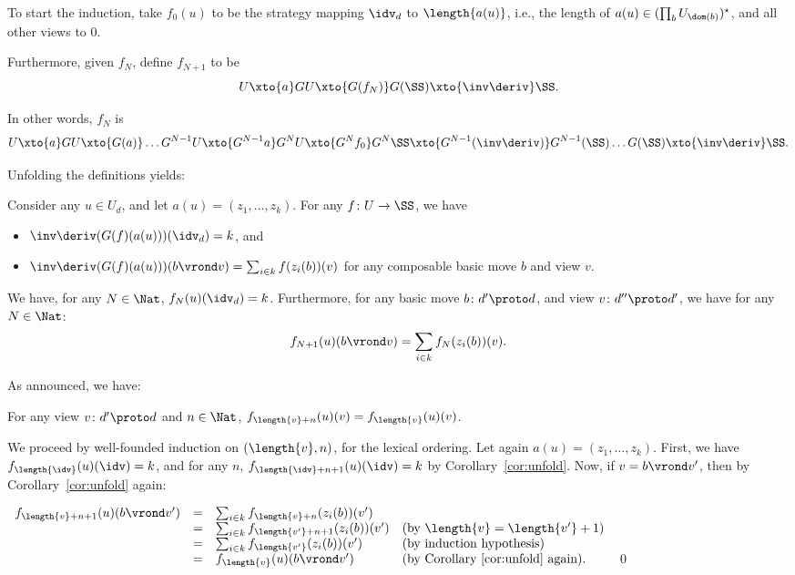 \documentclass{LMCS}
\theoremstyle{plain}\newtheorem{satz}[thm]{Satz}
\begin{document}
To start the induction, take $f_0 (u)$ to be the strategy mapping
$\idv_{d}$ to $\length{a (u)}$, i.e., the length of $a (u) \in
(\prod_{b} U_{\dom (b)})^\star$, and all other views to $0$.

Furthermore, given $f_N$, define $f_{N+1}$ to be
$$U \xto{a} G U \xto{G  (f_N)} G (\SS) \xto{\inv\deriv} \SS.$$

In other words, $f_N$ is 
$$U \xto{a} G U \xto{G (a)} \ldots G^{N-1} U \xto{G^{N-1} a} G^{N} U \xto{G^N f_0} 
G^N \SS \xto{G^{N-1}(\inv\deriv)} G^{N-1} (\SS) \ldots G(\SS) \xto{\inv\deriv} \SS.$$

Unfolding the definitions yields:
\begin{lem}\label{lem:unfold}
  Consider any $u \in U_d$, and let $a (u) = (z_1, \ldots, z_k)$.  For
 any $f \colon U \to
  \SS$, we have
  \begin{itemize}
  \item  $\inv\deriv(G(f)(a(u)))(\idv_d) = k$, and
  \item $\inv\deriv(G(f)(a(u)))(b \vrond v) = \sum_{i \in k} f
    (z_i (b)) (v)$ for any composable basic move $b$ and view $v$.
  \end{itemize}
\end{lem}

\begin{cor}\label{cor:unfold}
  We have, for any $N \in \Nat$, $f_N(u)(\idv_d) = k$.  
  Furthermore, for any basic move $b \colon d' \proto d$, and view $v \colon d''
  \proto d'$, we have for any $N \in \Nat$:
  $$f_{N+1} (u) (b \vrond v) = \sum_{i
    \in k} f_N (z_i (b)) (v).$$
\end{cor}

As announced, we have:
\begin{lem}\label{lem:station}
  For any view $v \colon d' \proto d$ and $n \in \Nat$,
  $f_{\length{v}+n}(u)(v) = f_{\length{v}} (u) (v)$.
\end{lem}
\proof
  We proceed by well-founded induction on $(\length{v},n)$, for the
  lexical ordering. 
  Let again $a(u) = (z_1, \ldots, z_k)$.
  First, we have $f_{\length{\idv}}(u) (\idv) = k$, and for any $n$,
  $f_{\length{\idv}+n+1}(u)(\idv) = k$ by Corollary~\ref{cor:unfold}.
  Now, if $v = b \vrond v'$, then by Corollary~\ref{cor:unfold} again:
  \begin{center}
    $\begin{array}[b]{rcll} f_{\length{v}+n+1} (u) (b \vrond v') &=&
      \sum_{i \in k} f_{\length{v}+n} (z_i(b)) (v') \\
      &=&
      \sum_{i \in k} f_{\length{v'}+n+1} (z_i(b)) (v') & \mbox{(by $\length{v} = \length{v'}+1$)}\\
      &=&
      \sum_{i \in k} f_{\length{v'}} (z_i(b)) (v') & \mbox{(by induction hypothesis)} \\
      &=& f_{\length{v}} (u) (b \vrond v') & \mbox{(by Corollary~\ref{cor:unfold} again).}
    \end{array}$ \qed
  \end{center}
\end{document}
